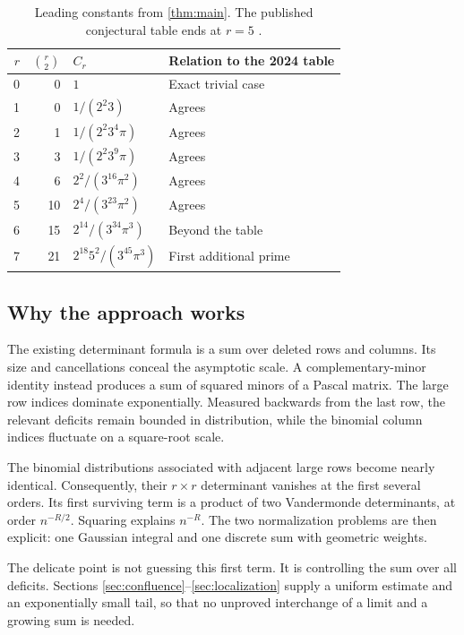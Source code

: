 \documentclass[11pt]{article}
\numberwithin{equation}{section}
\theoremstyle{definition}
\begin{document}
\begin{table}[ht]
\centering
\renewcommand{\arraystretch}{1.25}
\begin{tabular}{@{}rrll@{}}
\toprule
$r$ & $\binom r2$ & $C_r$ & Relation to the 2024 table\\
\midrule
0 &0& $1$ & Exact trivial case\\
1 &0& $1/(2^2 3)$ & Agrees\\
2 &1& $1/(2^2 3^4\pi)$ & Agrees\\
3 &3& $1/(2^2 3^9\pi)$ & Agrees\\
4 &6& $2^2/(3^{16}\pi^2)$ & Agrees\\
5 &10& $2^4/(3^{23}\pi^2)$ & Agrees\\
6 &15& $2^{14}/(3^{34}\pi^3)$ & Beyond the table\\
7 &21& $2^{18}5^2/(3^{45}\pi^3)$ & First additional prime\\
\bottomrule
\end{tabular}
\caption{Leading constants from \cref{thm:main}. The published conjectural table ends at $r=5$ \cite[p.~12]{DK}.}
\label{tab:constants}
\end{table}

\subsection{Why the approach works}
The existing determinant formula is a sum over deleted rows and columns. Its size and cancellations conceal the asymptotic scale. A complementary-minor identity instead produces a sum of squared minors of a Pascal matrix. The large row indices dominate exponentially. Measured backwards from the last row, the relevant deficits remain bounded in distribution, while the binomial column indices fluctuate on a square-root scale.

The binomial distributions associated with adjacent large rows become nearly identical. Consequently, their $r\times r$ determinant vanishes at the first several orders. Its first surviving term is a product of two Vandermonde determinants, at order $n^{-R/2}$. Squaring explains $n^{-R}$. The two normalization problems are then explicit: one Gaussian integral and one discrete sum with geometric weights.

The delicate point is not guessing this first term. It is controlling the sum over all deficits. Sections \ref{sec:confluence}--\ref{sec:localization} supply a uniform estimate and an exponentially small tail, so that no unproved interchange of a limit and a growing sum is needed.
\end{document}
